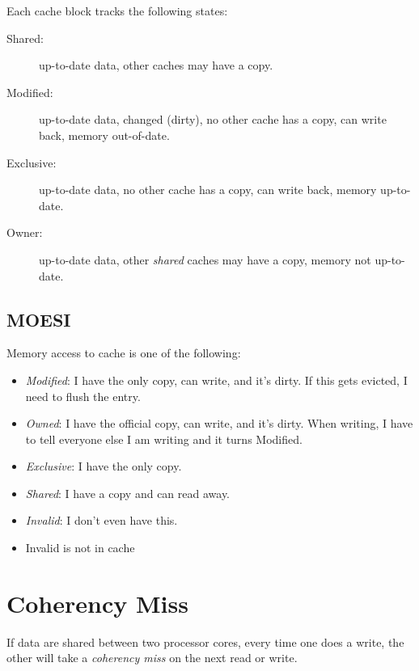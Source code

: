 Each cache block tracks the following states:
\begin{description}
	\item[Shared:] up-to-date data, other caches may have a copy.
	\item[Modified:] up-to-date data, changed (dirty), no other cache has a copy, can write back, memory out-of-date.
	\item[Exclusive:] up-to-date data, no other cache has a copy, can write back, memory up-to-date.
	\item[Owner:] up-to-date data, other \emph{shared} caches may have a copy, memory not up-to-date.
\end{description}

\subsection{MOESI}
Memory access to cache is one of the following:
\begin{itemize}
    \item \emph{Modified}: I have the only copy, can write, and it's dirty. If this gets evicted, I need to flush the entry.
    \item \emph{Owned}: I have the official copy, can write, and it's dirty. When writing, I have to tell everyone else I am writing and it turns Modified.
    \item \emph{Exclusive}: I have the only copy.
    \item \emph{Shared}: I have a copy and can read away.
    \item \emph{Invalid}: I don't even have this.
\end{itemize}
\begin{itemize}
    \item Invalid is not in cache
\end{itemize}

\section{Coherency Miss}
If data are shared between two processor cores, every time one does a write, the other will take a \emph{coherency miss} on the next read or write. 